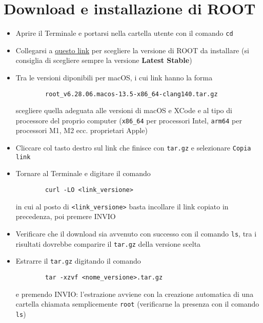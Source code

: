 \section{Download e installazione di ROOT}
\begin{itemize}
	\item Aprire il Terminale e portarsi nella cartella utente con il comando \texttt{cd}
	\item Collegarsi a \hyperref{https://root.cern/install/all_releases/}{}{}{questo link} per scegliere la versione di ROOT da installare (si consiglia di scegliere sempre la versione \textbf{Latest Stable})
	\item Tra le versioni diponibili per macOS, i cui link hanno la forma
	\begin{verbatim}
		root_v6.28.06.macos-13.5-x86_64-clang140.tar.gz
	\end{verbatim}
	scegliere quella adeguata alle versioni di macOS e XCode e al tipo di processore del proprio computer (\texttt{x86\_64} per processori Intel, \texttt{arm64} per processori M1, M2 ecc. proprietari Apple)
	\item Cliccare col tasto destro sul link che finisce con \texttt{tar.gz} e selezionare \texttt{Copia link} 
	\item Tornare al Terminale e digitare il comando
	\begin{verbatim}
		curl -LO <link_versione>
	\end{verbatim}
	in cui al posto di \texttt{<link\_versione>} basta incollare il link copiato in precedenza, poi premere INVIO
	\item Verificare che il download sia avvenuto con successo con il comando \texttt{ls}, tra i risultati dovrebbe comparire il \texttt{tar.gz} della versione scelta
	\item Estrarre il \texttt{tar.gz} digitando il comando
	\begin{verbatim}
		tar -xzvf <nome_versione>.tar.gz
	\end{verbatim}
	e premendo INVIO: l'estrazione avviene con la creazione automatica di una cartella chiamata semplicemente \texttt{root} (verificarne la presenza con il comando \texttt{ls})
\end{itemize}

